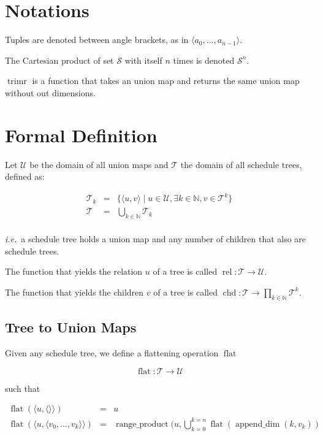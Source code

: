 \documentclass{article}
\DeclareMathOperator\flaty{flat}
\DeclareMathOperator\rangeproduct{range\_product}
\DeclareMathOperator\appenddim{append\_dim}
\DeclareMathOperator\trimr{trimr}
\DeclareMathOperator\rel{rel}
\DeclareMathOperator\chd{chd}
\begin{document}
\section*{Notations}

Tuples are denoted between angle brackets, as in $\langle a_0, \ldots,
a_{n-1}\rangle$.

The Cartesian product of set $\mathcal{S}$ with itself $n$ times is denoted
$\mathcal{S}^n$.

$\trimr$ is a function that takes an union map and returns the same union map without out dimensions.

\section{Formal Definition}


Let $\mathcal{U}$ be the domain of all union maps and $\mathcal{T}$ the domain
of all schedule trees, defined as:

\[
    \begin{array}{lcl}
        \mathcal{T}_k &=& \{ \langle u, v\rangle \mid u \in \mathcal{U}, \exists k\in\mathbb{N}, v \in \mathcal{T}^k \} \\
        \mathcal{T} &=& \displaystyle\bigcup_{k\in\mathbb{N}} \mathcal{T}_k\\
    \end{array}
\]

\noindent \emph{i.e.}\ a schedule tree holds a union map and any number of children that also are schedule trees.

The function that yields the relation $u$ of a tree is called $\rel:\mathcal{T} \rightarrow \mathcal{U}$.

The function that yields the children $v$ of a tree is called $\chd:\mathcal{T} \rightarrow \displaystyle\prod_{k\in\mathbb{N}}\mathcal{T}^k$.

\subsection{Tree to Union Maps}

Given any schedule tree, we define a flattening operation $\flaty$

\[
    \flaty: \mathcal{T} \rightarrow \mathcal{U}
\]

\noindent such that

\[
    \begin{array}{lcl}
        \flaty(\langle u, \langle\rangle \rangle) &=& u \\
        \flaty(\langle u, \langle v_0, \ldots, v_k\rangle \rangle) &=& \rangeproduct(u, \bigcup_{k=0}^{k=n} \flaty(\appenddim(k, v_k)) \\
    \end{array}
\]
\end{document}
